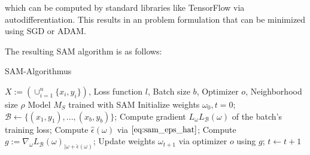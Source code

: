 \documentclass[10pt,conference,compsocconf]{IEEEtran}
\begin{document}
 which can be computed by standard libraries like TensorFlow via autodifferentiation. This results in an problem formulation that can be minimized using SGD or ADAM. 

The resulting SAM algorithm is as follows: 

\begin{algorithm}
\caption{SAM-Algorithmus}\label{alg:sam}
\begin{algorithmic}
\Require $X := (\cup_{i = 1}^n\{x_i, y_i\})$, Loss function $l$, Batch size $b$, Optimizer $o$, Neighborhood size $\rho$
\Ensure Model $M_S$ trained with SAM
\State Initialize weights $\omega_0, t = 0$;
	\State $\mathcal{B} \gets \{(x_1, y_1), ..., (x_b, y_b)\}$;	
	\State Compute gradient $L_\omega L_\mathcal{B}(\omega)$ of the batch's training loss; 
	\State Compute $\hat{\epsilon}(\omega)$ via $\eqref{eq:sam_eps_hat}$; 
	\State Compute $g := \nabla_\omega L_\mathcal{B}(\omega)_{|\omega + \hat{\epsilon}(\omega)}$; 
	\State Update weights $\omega_{t+1}$ via optimizer $o$ using $g$;
	\State $t \gets t+1$
\EndWhile
\end{algorithmic}
\end{algorithm}
\end{document}
